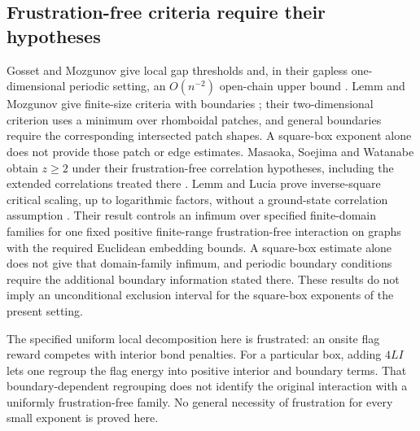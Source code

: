 \subsection{Frustration-free criteria require their hypotheses}
Gosset and Mozgunov give local gap thresholds and, in their gapless
one-dimensional periodic setting, an $O(n^{-2})$ open-chain upper bound
\cite{gossetMozgunov}. Lemm and Mozgunov give finite-size criteria with
boundaries \cite{lemmMozgunov}; their two-dimensional criterion uses a
minimum over rhomboidal patches, and general boundaries require the
corresponding intersected patch shapes. A square-box exponent alone does
not provide those patch or edge estimates. Masaoka, Soejima and Watanabe
obtain $z\geq2$ under their frustration-free correlation hypotheses,
including the extended correlations treated there
\cite{masaokaSoejimaWatanabe}. Lemm and Lucia prove inverse-square critical scaling, up to logarithmic
factors, without a ground-state correlation assumption
\cite[Theorem~1.4 and Remark~1.5]{lemmLucia}. Their result controls an
infimum over specified finite-domain families for one fixed positive
finite-range frustration-free interaction on graphs with the required
Euclidean embedding bounds. A square-box estimate alone does not give
that domain-family infimum, and periodic boundary conditions require the
additional boundary information stated there. These results do not imply
an unconditional exclusion interval for the square-box exponents of the
present setting.

The specified uniform local decomposition here is frustrated: an onsite
flag reward competes with interior bond penalties. For a particular box,
adding $4LI$ lets one regroup the flag energy into positive interior and
boundary terms. That boundary-dependent regrouping does not identify the
original interaction with a uniformly frustration-free family. No general
necessity of frustration for every small exponent is proved here.

